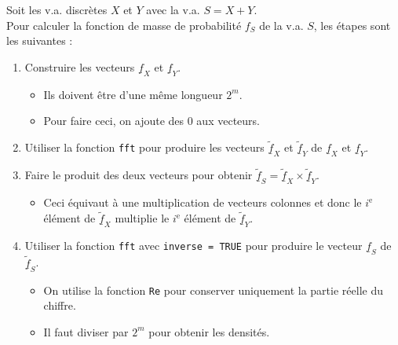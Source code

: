 \documentclass[10pt, french]{article}
\begin{document}
\begin{multicols*}{2}
\begin{algo2}
Soit les v.a. discrètes $X$ et $Y$ avec la v.a. $S	=	X + Y$.	\\
Pour calculer la fonction de masse de probabilité $f_{S}$ de la v.a. $S$, les étapes sont les suivantes :
\begin{enumerate}
	\item	Construire les vecteurs $\underline{f}_{X}$ et $\underline{f}_{Y}$.
		\begin{itemize}
		\item	Ils doivent être d'une même longueur $2^{m}$.
		\item	Pour faire ceci, on ajoute des 0 aux vecteurs.
		\end{itemize}
	\item	Utiliser la fonction \texttt{fft} pour produire les vecteurs $\underline{\widetilde{f}}_{X}$ et $\underline{\widetilde{f}}_{Y}$ de $\underline{f}_{X}$ et $\underline{f}_{Y}$.
	\item	Faire le produit des deux vecteurs pour obtenir $\underline{\widetilde{f}}_{S}	=	\underline{\widetilde{f}}_{X} \times \underline{\widetilde{f}}_{Y}$.	
		\begin{itemize}
		\item	Ceci équivaut à une multiplication de vecteurs colonnes et donc le $i^{\text{e}}$ élément de $\underline{\widetilde{f}}_{X}$ multiplie le $i^{\text{e}}$ élément de $\underline{\widetilde{f}}_{Y}$.
		\end{itemize}
	\item	Utiliser la fonction \texttt{fft} avec \texttt{inverse = TRUE} pour produire le vecteur $\underline{f}_{S}$ de $\underline{\widetilde{f}}_{S}$.
		\begin{itemize}
		\item	On utilise la fonction \texttt{Re} pour conserver uniquement la partie réelle du chiffre.
		\item	Il faut diviser par $2^{m}$ pour obtenir les densités.
		\end{itemize}
\end{enumerate}
\end{algo2}


\end{multicols*}
\end{document}
